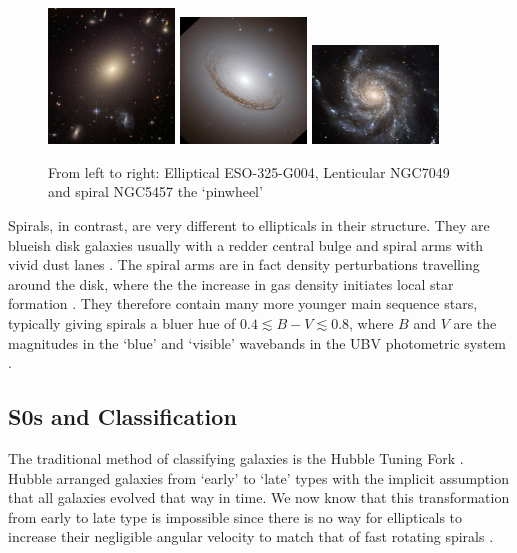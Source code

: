 \begin{figure}[h]
	\centering
	\includegraphics[width=0.3\textwidth, height=0.25\textheight]{figs/elliptical_ESO_325-G004.jpg}
	\includegraphics[width=0.3\textwidth, height=0.25\textheight]{figs/S0_NGC7049.jpg}
	\includegraphics[width=0.3\textwidth, height=0.25\textheight]{figs/spiral_NGC5457_pinwheel.jpg}
	\label{galaxy type pictures}
	\caption{From left to right: Elliptical ESO-325-G004, Lenticular NGC7049 and spiral NGC5457 the `pinwheel'}
\end{figure}

Spirals, in contrast, are very different to ellipticals in their structure. They are blueish disk galaxies usually with a redder central bulge and spiral arms with vivid dust lanes \citep{sparke_galaxies_2000}. The spiral arms are in fact density perturbations travelling around the disk, where the the increase in gas density initiates local star formation \citep{kennicutt_star_1998}. They therefore contain many more younger  main sequence stars, typically giving spirals a bluer hue of $0.4\lesssim B-V \lesssim 0.8$, where $B$ and $V$ are the magnitudes in the `blue' and `visible' wavebands in the UBV photometric system \citep{sparke_galaxies_2000}.

\subsection{S0s and Classification}
The traditional method of classifying galaxies is the Hubble Tuning Fork \citep{hubble_no._1926}. Hubble arranged galaxies from `early' to `late' types with the implicit assumption that all galaxies evolved that way in time. We now know that this transformation from early to late type is impossible since there is no way for ellipticals to increase their negligible angular velocity to match that of fast rotating spirals \citep{carroll_introduction_2007}. 

